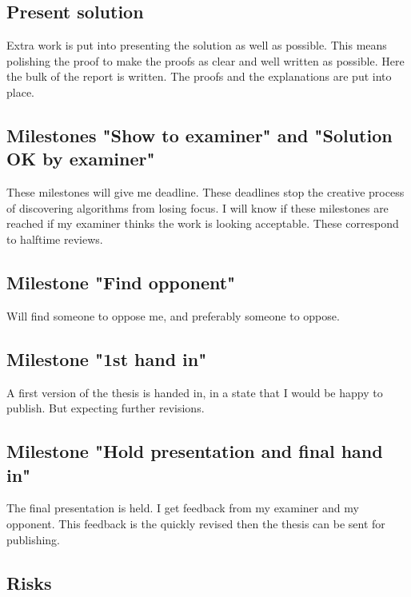 \documentclass[msc,lith,english]{liuthesis}
\begin{document}
\subsection{Present solution}
Extra work is put into presenting the solution as well as possible.
This means polishing the proof to make the proofs as clear and well written as possible.
Here the bulk of the report is written. The proofs and the explanations are put into place.

\subsection{Milestones "Show to examiner" and "Solution OK by examiner"}
These milestones will give me deadline.
These deadlines stop the creative process of discovering algorithms from losing focus.
I will know if these milestones are reached if my examiner thinks the work is looking acceptable.
These correspond to halftime reviews.

\subsection{Milestone "Find opponent"}
Will find someone to oppose me, and preferably someone to oppose. 

\subsection{Milestone "1st hand in"}
A first version of the thesis is handed in, in a state that I would be happy to
publish. But expecting further revisions.

\subsection{Milestone "Hold presentation and final hand in"}
The final presentation is held. I get feedback from my examiner and my
opponent. This feedback is the quickly revised then the thesis can be sent for
publishing.

\subsection{Risks}
\end{document}

